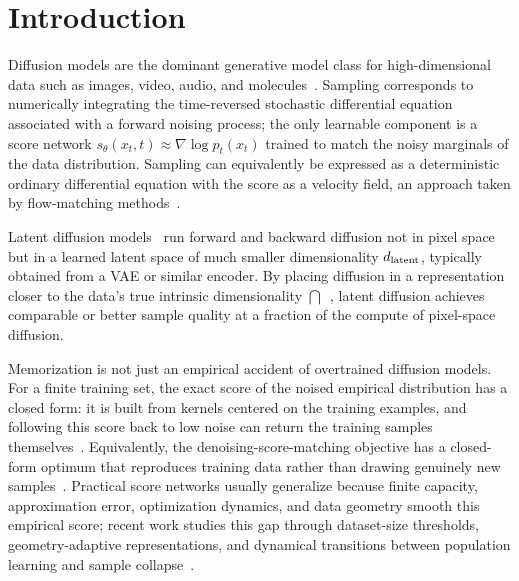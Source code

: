 \section{Introduction}
\label{sec:intro}

Diffusion models are the dominant generative model class for high-dimensional data such as images, video, audio, and molecules~\citep{ho2020denoising, song2021scoresde, rombach2022highresolution, karras2022elucidating, leeGenMolDrugDiscovery2025}. Sampling corresponds to numerically integrating the time-reversed stochastic differential equation associated with a forward noising process; the only learnable component is a score network $s_\theta(x_t, t) \approx \nabla \log p_t(x_t)$ trained to match the noisy marginals of the data distribution. Sampling can equivalently be expressed as a deterministic ordinary differential equation with the score as a velocity field, an approach taken by flow-matching methods~\citep{lipman2023flow}.

Latent diffusion models~\citep{rombach2022highresolution, esser2024sd3, podell2023sdxl} run forward and backward diffusion not in pixel space but in a learned latent space of much smaller dimensionality $d_{\mathrm{latent}}$, typically obtained from a VAE or similar encoder. By placing diffusion in a representation closer to the data's true intrinsic dimensionality $\dint$~\citep{pope2021, brown2022manifold, stanczuk2024manifold, kamkari2024geometric}, latent diffusion achieves comparable or better sample quality at a fraction of the compute of pixel-space diffusion.

Memorization is not just an empirical accident of overtrained diffusion models. For a finite training set, the exact score of the noised empirical distribution has a closed form: it is built from kernels centered on the training examples, and following this score back to low noise can return the training samples themselves~\citep{scarvelis2023closedform}. Equivalently, the denoising-score-matching objective has a closed-form optimum that reproduces training data rather than drawing genuinely new samples~\citep{gu2023memorization}. Practical score networks usually generalize because finite capacity, approximation error, optimization dynamics, and data geometry smooth this empirical score; recent work studies this gap through dataset-size thresholds, geometry-adaptive representations, and dynamical transitions between population learning and sample collapse~\citep{kadkhodaie2023learning,biroli2024dynamical,bonnaire2025}.

